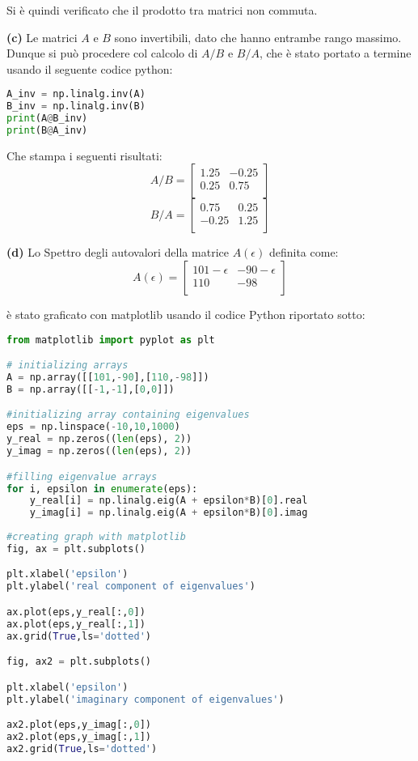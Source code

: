 \documentclass{article}
\begin{document}
Si è quindi verificato che il prodotto tra matrici non commuta.

\textbf{(c)}
Le matrici $A$ e $B$ sono invertibili, dato che hanno entrambe rango massimo. Dunque si può procedere col calcolo di $A/B$ e $B/A$, che è stato portato a termine usando il seguente codice python:
\begin{lstlisting}[language = Python]
A_inv = np.linalg.inv(A)
B_inv = np.linalg.inv(B)
print(A@B_inv)
print(B@A_inv)
\end{lstlisting}
Che stampa i seguenti risultati: \[
A/B =
\begin{bmatrix}
    1.25 & -0.25 \\
    0.25  & 0.75 \\
\end{bmatrix} \]
\[
B/A =
\begin{bmatrix}
    0.75 & 0.25 \\
    -0.25  &1.25 \\
\end{bmatrix}
\]

\textbf{(d)}
Lo Spettro degli autovalori della matrice $A(\epsilon)$ definita come: \[
A(\epsilon) =
\begin{bmatrix}
    101-\epsilon & -90-\epsilon \\
    110  & -98 \\
\end{bmatrix}
\]

è stato graficato con matplotlib usando il codice Python riportato sotto:

\begin{lstlisting}[language = Python]
from matplotlib import pyplot as plt

# initializing arrays
A = np.array([[101,-90],[110,-98]])
B = np.array([[-1,-1],[0,0]])

#initializing array containing eigenvalues
eps = np.linspace(-10,10,1000)
y_real = np.zeros((len(eps), 2))
y_imag = np.zeros((len(eps), 2))

#filling eigenvalue arrays
for i, epsilon in enumerate(eps):
    y_real[i] = np.linalg.eig(A + epsilon*B)[0].real
    y_imag[i] = np.linalg.eig(A + epsilon*B)[0].imag
    
#creating graph with matplotlib
fig, ax = plt.subplots()

plt.xlabel('epsilon')
plt.ylabel('real component of eigenvalues')

ax.plot(eps,y_real[:,0])
ax.plot(eps,y_real[:,1])
ax.grid(True,ls='dotted')

fig, ax2 = plt.subplots()

plt.xlabel('epsilon')
plt.ylabel('imaginary component of eigenvalues')

ax2.plot(eps,y_imag[:,0])
ax2.plot(eps,y_imag[:,1])
ax2.grid(True,ls='dotted')
\end{lstlisting}
\end{document}
